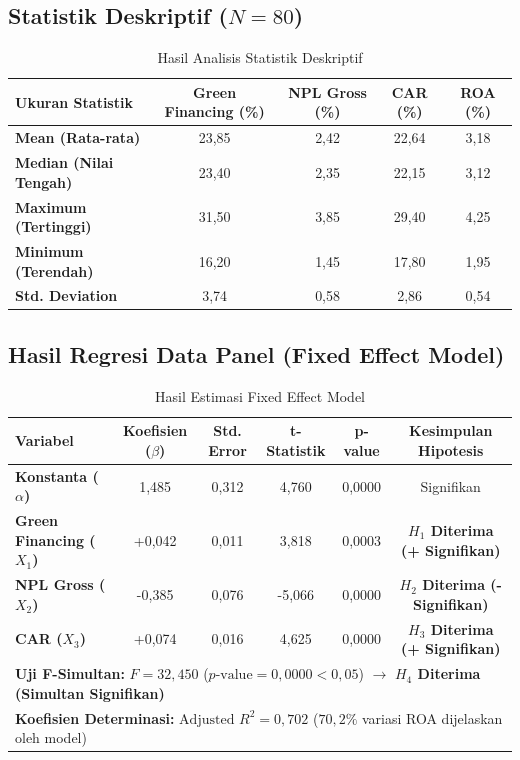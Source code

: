 \documentclass[11pt,a4paper]{article}
\begin{document}
\subsection{Statistik Deskriptif ($N = 80$)}
\begin{table}[htbp]
\centering
\small
\renewcommand{\arraystretch}{1.2}
\caption{Hasil Analisis Statistik Deskriptif}
\begin{tabular}{lcccc}
\toprule
\rowcolor{tableHeaderBg}
\textbf{Ukuran Statistik} & \textbf{Green Financing (\%)} & \textbf{NPL Gross (\%)} & \textbf{CAR (\%)} & \textbf{ROA (\%)} \\
\midrule
\textbf{Mean (Rata-rata)} & 23,85 & 2,42 & 22,64 & 3,18 \\
\textbf{Median (Nilai Tengah)} & 23,40 & 2,35 & 22,15 & 3,12 \\
\textbf{Maximum (Tertinggi)} & 31,50 & 3,85 & 29,40 & 4,25 \\
\textbf{Minimum (Terendah)} & 16,20 & 1,45 & 17,80 & 1,95 \\
\textbf{Std. Deviation} & 3,74 & 0,58 & 2,86 & 0,54 \\
\bottomrule
\end{tabular}
\end{table}

\subsection{Hasil Regresi Data Panel (Fixed Effect Model)}
\begin{table}[htbp]
\centering
\small
\renewcommand{\arraystretch}{1.25}
\caption{Hasil Estimasi Fixed Effect Model}
\begin{tabular}{lccccc}
\toprule
\rowcolor{tableHeaderBg}
\textbf{Variabel} & \textbf{Koefisien ($\beta$)} & \textbf{Std. Error} & \textbf{t-Statistik} & \textbf{p-value} & \textbf{Kesimpulan Hipotesis} \\
\midrule
\textbf{Konstanta ($\alpha$)} & 1,485 & 0,312 & 4,760 & 0,0000 & Signifikan \\
\textbf{Green Financing ($X_1$)} & +0,042 & 0,011 & 3,818 & 0,0003 & \textbf{$H_1$ Diterima (+ Signifikan)} \\
\textbf{NPL Gross ($X_2$)} & -0,385 & 0,076 & -5,066 & 0,0000 & \textbf{$H_2$ Diterima (- Signifikan)} \\
\textbf{CAR ($X_3$)} & +0,074 & 0,016 & 4,625 & 0,0000 & \textbf{$H_3$ Diterima (+ Signifikan)} \\
\midrule
\multicolumn{6}{l}{\textbf{Uji F-Simultan:} $F = 32{,}450$ \quad ($p\text{-value} = 0{,}0000 < 0{,}05$) $\rightarrow$ \textbf{$H_4$ Diterima (Simultan Signifikan)}} \\
\multicolumn{6}{l}{\textbf{Koefisien Determinasi:} $\text{Adjusted } R^2 = 0{,}702$ ($70{,}2\%$ variasi ROA dijelaskan oleh model)} \\
\bottomrule
\end{tabular}
\end{table}
\end{document}
